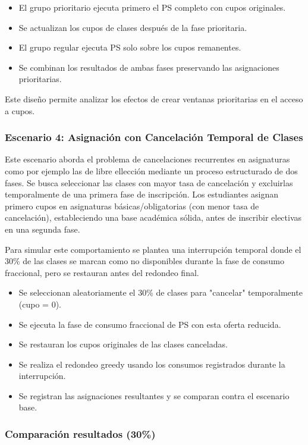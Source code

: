 \documentclass{article}
\begin{document}
\begin{itemize}
\item El grupo prioritario ejecuta primero el PS completo con cupos originales.
\item Se actualizan los cupos de clases después de la fase prioritaria.
\item El grupo regular ejecuta PS solo sobre los cupos remanentes.
\item Se combinan los resultados de ambas fases preservando las asignaciones prioritarias.
\end{itemize}

Este diseño permite analizar los efectos de crear ventanas prioritarias en el acceso a cupos.

\subsubsection{Escenario 4: Asignación con Cancelación Temporal de Clases}

Este escenario aborda el problema de cancelaciones recurrentes en asignaturas como por ejemplo las de libre ellección
 mediante un proceso estructurado de dos fases. Se busca seleccionar las clases con mayor tasa de cancelación
  y excluirlas temporalmente de una primera fase de inscripción. Los estudiantes asignan primero cupos en asignaturas básicas/obligatorias
   (con menor tasa de cancelación),
  estableciendo una base académica sólida, antes de inscribir electivas en una segunda fase. 

Para simular este comportamiento se plantea una interrupción temporal donde el 30\% de las clases se marcan 
como no disponibles durante la fase de consumo fraccional, 
pero se restauran antes del redondeo final. 

\begin{itemize}
\item Se seleccionan aleatoriamente el 30\% de clases para "cancelar" temporalmente (cupo = 0).
\item Se ejecuta la fase de consumo fraccional de PS con esta oferta reducida.
\item Se restauran los cupos originales de las clases canceladas.
\item Se realiza el redondeo greedy usando los consumos registrados durante la interrupción.
\item Se registran las asignaciones resultantes y se comparan contra el escenario base.
\end{itemize}

\subsubsection{Comparación resultados (30\%)}
\end{document}
